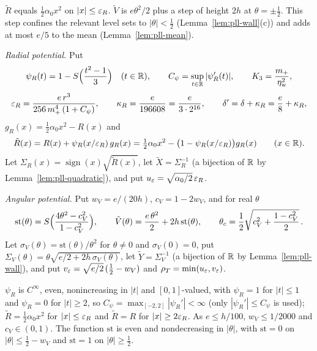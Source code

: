 $\tilde R$ equals $\frac12\alpha_0x^2$ on $|x|\le\varepsilon_R$. $\tilde V$ is $e\theta^2/2$ plus a step of height $2h$ at $\theta=\pm\frac12$. This step confines the relevant level sets to $|\theta|<\frac12$ (Lemma~\ref{lem:pll-wall}(c)) and adds at most $e/5$ to the mean (Lemma~\ref{lem:pll-mean}).

\begin{construction}\label{cons:pll-morse}
\emph{Radial potential.} Put
\[
 \psi_R(t)=1-S\Bigl(\frac{t^2-1}{3}\Bigr)\quad(t\in\mathbb{R}),\qquad C_\psi=\sup_{t\in\mathbb{R}}|\psi_R'(t)|,\qquad
 K_3=\frac{m_+}{\eta_{\rm w}^2},
\]
\[
 \varepsilon_R=\frac{e\,r^3}{256\,m_+^4\,(1+C_\psi)},\qquad
 \kappa_R=\frac{e}{196608}=\frac{e}{3\cdot2^{16}},\qquad \delta'=\delta+\kappa_R=\frac e8+\kappa_R,
\]
$g_R(x)=\frac12\alpha_0x^2-R(x)$ and
\[
 \tilde R(x)=R(x)+\psi_R(x/\varepsilon_R)\,g_R(x)=\tfrac12\alpha_0x^2-\bigl(1-\psi_R(x/\varepsilon_R)\bigr)g_R(x)\qquad(x\in\mathbb{R}).
\]
Let $\Sigma_R(x)=\operatorname{sign}(x)\sqrt{\tilde R(x)}$, let $\tilde X=\Sigma_R^{-1}$ (a bijection of $\mathbb{R}$ by
Lemma~\ref{lem:pll-quadratic}), and put $u_\varepsilon=\sqrt{\alpha_0/2}\,\varepsilon_R$.

\emph{Angular potential.} Put $w_V=e/(20h)$, $c_V=1-2w_V$, and for real $\theta$
\[
 \mathrm{st}(\theta)=S\Bigl(\frac{4\theta^2-c_V^2}{1-c_V^2}\Bigr),\qquad
 \tilde V(\theta)=\frac{e\,\theta^2}{2}+2h\,\mathrm{st}(\theta),\qquad
 \theta_c=\frac12\sqrt{c_V^2+\frac{1-c_V^2}2}\, .
\]
Let $\sigma_V(\theta)=\mathrm{st}(\theta)/\theta^2$ for $\theta\ne0$ and $\sigma_V(0)=0$, put
$\Sigma_V(\theta)=\theta\sqrt{e/2+2h\,\sigma_V(\theta)}$, let $\tilde Y=\Sigma_V^{-1}$ (a bijection of $\mathbb{R}$ by
Lemma~\ref{lem:pll-wall}), and put $v_\varepsilon=\sqrt{e/2}\,(\frac12-w_V)$ and $\rho_T=\min(u_\varepsilon,v_\varepsilon)$.
\end{construction}

$\psi_R$ is $C^\infty$, even, nonincreasing in $|t|$ and $[0,1]$-valued, with $\psi_R=1$ for $|t|\le1$ and $\psi_R=0$ for $|t|\ge2$, so $C_\psi=\max_{[-2,2]}|\psi_R'|<\infty$ (only $|\psi_R'|\le C_\psi$ is used); $\tilde R=\frac12\alpha_0x^2$ for $|x|\le\varepsilon_R$ and $\tilde R=R$ for $|x|\ge2\varepsilon_R$. As $e\le h/100$, $w_V\le1/2000$ and $c_V\in(0,1)$. The function $\mathrm{st}$ is even and nondecreasing in $|\theta|$, with $\mathrm{st}=0$ on $|\theta|\le\frac12-w_V$ and $\mathrm{st}=1$ on $|\theta|\ge\frac12$.

